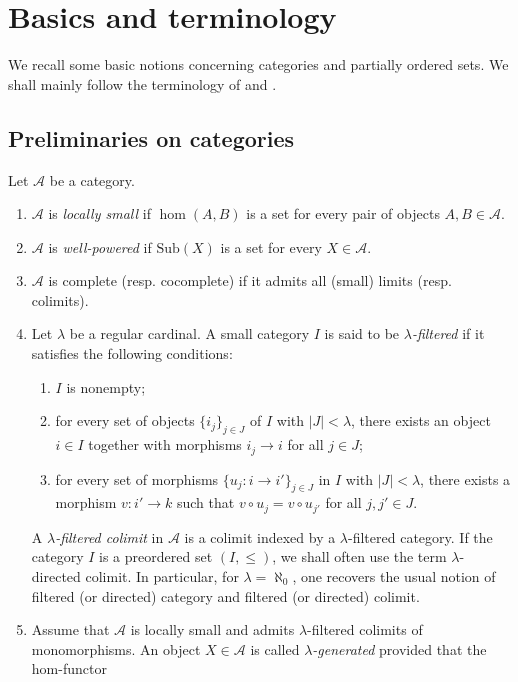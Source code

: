 \documentclass{amsproc}
\theoremstyle{definition}
\theoremstyle{plain}
\theoremstyle{remark}
\numberwithin{equation}{section}
\newcommand{\sub}[1]{\mathrm{Sub} (#1)}
\begin{document}
\section{Basics and terminology}
We recall some basic notions concerning categories and partially ordered sets. We shall mainly follow the terminology of \cite{adamek-rosicky} and \cite{Gierz2003}.

\subsection{Preliminaries on categories}

Let $\mathscr{A}$ be a category. 
\begin{enumerate}
    \item 
    $\mathscr{A}$ is {\em locally small} if $\hom(A,B)$ is a set for every pair of objects $A,B \in \mathscr{A}$.
    \item 
    $\mathscr{A}$ is {\em well-powered} if $\sub X$ is a set for every $X \in \mathscr{A}$.
    \item 
    $\mathscr{A}$ is complete (resp. cocomplete) if it admits all (small) limits (resp. colimits).
    \item
    Let $\lambda$ be a regular cardinal. A small category $I$ is said to be \emph{$\lambda$-filtered} if it satisfies the following conditions:
        \begin{enumerate}
        \item $I$ is nonempty;
        \item for every set of objects $\{i_j\}_{j \in J}$ of $I$ with $|J| < \lambda$, there exists an object $i \in I$ together with morphisms $i_j \to i$ for all $j \in J$;
        \item for every set of morphisms $\{u_j : i \to i'\}_{j \in J}$ in $I$ with $|J| < \lambda$, there exists a morphism $v : i' \to k$ such that $v \circ u_j = v \circ u_{j'}$ for all $j,j' \in J$.
    \end{enumerate}
    A \emph{$\lambda$-filtered colimit} in $\mathcal{A}$ is a colimit indexed by a $\lambda$-filtered category.
    If the category $I$ is a preordered set $(I,\leq)$, we shall often use the term $\lambda$-directed colimit.
    In particular, for $\lambda = \aleph_0$, one recovers the usual notion of filtered (or directed) category and filtered (or directed) colimit.
    \item 
    Assume that $\mathscr{A}$ is locally small and admits $\lambda$-filtered colimits of monomorphisms. An object $X \in \mathscr{A}$ is called {\em  $\lambda$-generated} provided that the hom-functor

\end{enumerate}
\end{document}
